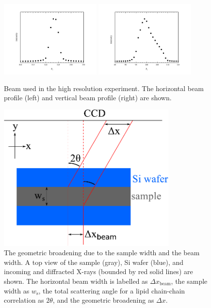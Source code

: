 
\begin{figure}[htbp]
  \centering
  \includegraphics[width=0.45\textwidth]{figures/ripple/beamx_hr}
  \includegraphics[width=0.45\textwidth]{figures/ripple/beamz_hr}
  \caption{Beam used in the high resolution experiment.
  The horizontal beam profile (left) and vertical beam profile (right)
  are shown.}
  \label{fig:NGIWAXS_beam}
\end{figure} 

\begin{figure}[htbp]
  \centering
  \includegraphics[width=0.8\textwidth]{figures/ripple/geometric_broadening}
  \caption{The geometric broadening due to the sample width and the beam width.
  A top view of the sample (gray), Si wafer (blue), and 
  incoming and diffracted X-rays (bounded by red solid lines)
  are shown. The horizontal beam width is labelled as $\Delta x_\textrm{beam}$,
  the sample width as $w_\textrm{s}$, the total scattering
  angle for a lipid chain-chain correlation as $2\theta$, and 
  the geometric broadening as $\Delta x$.}
  \label{fig:geometric_broadening}
\end{figure}

